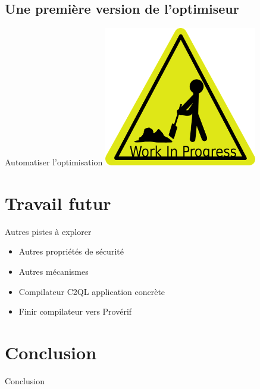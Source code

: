 \documentclass{beamer}
\begin{document}
\subsection{Une première version de l'optimiseur}
\begin{frame}{Automatiser l'optimisation}
\includegraphics[width = 0.5\textwidth]{work.png}
\end{frame}

\section{Travail futur}

\begin{frame}

\begin{block}{Autres pistes à explorer}
\begin{itemize}
\item Autres propriétés de sécurité
\item Autres mécanismes
\item Compilateur C2QL application concrète
\item Finir compilateur vers Provérif
\end{itemize}
\end{block}

\end{frame}

\section*{Conclusion}
\begin{frame}{Conclusion}
\end{frame}
\end{document}
